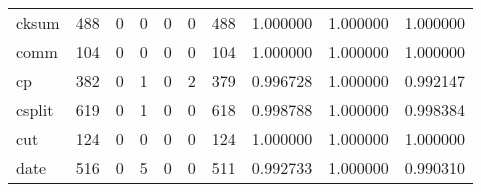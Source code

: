 \begin{longtable}{lrrrrrrrrr}
cksum     &                                   488 &                                                  0 &                                                  0 &                                                  0 &                                                  0 &                                                488 &                                           1.000000 &                               1.000000 &                             1.000000 \\
comm      &                                   104 &                                                  0 &                                                  0 &                                                  0 &                                                  0 &                                                104 &                                           1.000000 &                               1.000000 &                             1.000000 \\
cp        &                                   382 &                                                  0 &                                                  1 &                                                  0 &                                                  2 &                                                379 &                                           0.996728 &                               1.000000 &                             0.992147 \\
csplit    &                                   619 &                                                  0 &                                                  1 &                                                  0 &                                                  0 &                                                618 &                                           0.998788 &                               1.000000 &                             0.998384 \\
cut       &                                   124 &                                                  0 &                                                  0 &                                                  0 &                                                  0 &                                                124 &                                           1.000000 &                               1.000000 &                             1.000000 \\
date      &                                   516 &                                                  0 &                                                  5 &                                                  0 &                                                  0 &                                                511 &                                           0.992733 &                               1.000000 &                             0.990310 \\

\end{longtable}
